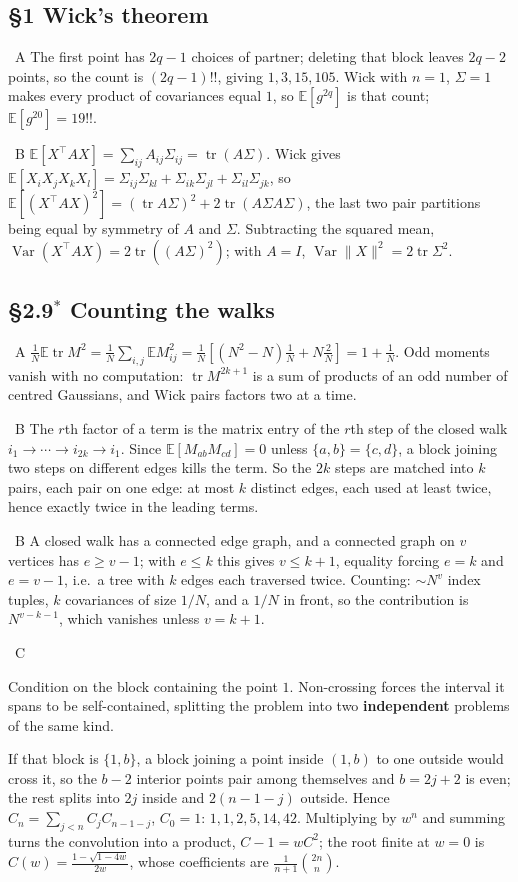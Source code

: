 \documentclass[10pt]{article}
\newcommand{\Q}[2]{\medskip\noindent{\color{acc}\textbf{#1}}\ {\scriptsize\color{grey}\textsc{#2}}\quad}
\newcommand{\E}{\mathbb{E}}
\newcommand{\Var}{\operatorname{Var}}
\newcommand{\Tr}{\operatorname{tr}}
\newcommand{\T}{^{\!\top}}
\begin{document}
\subsection{\S1 Wick's theorem}

\Q{1.6}{A} The first point has $2q-1$ choices of partner; deleting that block leaves $2q-2$ points, so the count is $(2q-1)!!$, giving $1,3,15,105$. Wick with $n=1$, $\Sigma=1$ makes every product of covariances equal $1$, so $\E[g^{2q}]$ is that count; $\E[g^{20}]=19!!$.

\Q{1.7}{B} $\E[X\T AX]=\sum_{ij}A_{ij}\Sigma_{ij}=\Tr(A\Sigma)$. Wick gives $\E[X_iX_jX_kX_l]=\Sigma_{ij}\Sigma_{kl}+\Sigma_{ik}\Sigma_{jl}+\Sigma_{il}\Sigma_{jk}$, so $\E[(X\T AX)^2]=(\Tr A\Sigma)^2+2\Tr(A\Sigma A\Sigma)$, the last two pair partitions being equal by symmetry of $A$ and $\Sigma$. Subtracting the squared mean, $\Var(X\T AX)=2\Tr((A\Sigma)^2)$; with $A=I$, $\Var\|X\|^2=2\Tr\Sigma^2$.

\subsection{\S2.9$^\ast$ Counting the walks}

\Q{2.12}{A} $\frac1N\E\Tr M^2=\frac1N\sum_{i,j}\E M_{ij}^2=\frac1N[(N^2-N)\tfrac1N+N\tfrac2N]=1+\frac1N$. Odd moments vanish with no computation: $\Tr M^{2k+1}$ is a sum of products of an odd number of centred Gaussians, and Wick pairs factors two at a time.

\Q{2.13}{B} The $r$th factor of a term is the matrix entry of the $r$th step of the closed walk $i_1\to\cdots\to i_{2k}\to i_1$. Since $\E[M_{ab}M_{cd}]=0$ unless $\{a,b\}=\{c,d\}$, a block joining two steps on different edges kills the term. So the $2k$ steps are matched into $k$ pairs, each pair on one edge: at most $k$ distinct edges, each used at least twice, hence exactly twice in the leading terms.

\Q{2.14}{B} A closed walk has a connected edge graph, and a connected graph on $v$ vertices has $e\ge v-1$; with $e\le k$ this gives $v\le k+1$, equality forcing $e=k$ and $e=v-1$, i.e.\ a tree with $k$ edges each traversed twice. Counting: $\sim N^v$ index tuples, $k$ covariances of size $1/N$, and a $1/N$ in front, so the contribution is $N^{v-k-1}$, which vanishes unless $v=k+1$.

\Q{2.15}{C}
\begin{idea}
Condition on the block containing the point $1$. Non-crossing forces the interval it spans to be self-contained, splitting the problem into two \textbf{independent} problems of the same kind.
\end{idea}
If that block is $\{1,b\}$, a block joining a point inside $(1,b)$ to one outside would cross it, so the $b-2$ interior points pair among themselves and $b=2j+2$ is even; the rest splits into $2j$ inside and $2(n-1-j)$ outside. Hence $C_n=\sum_{j<n}C_jC_{n-1-j}$, $C_0=1$: $1,1,2,5,14,42$. Multiplying by $w^n$ and summing turns the convolution into a product, $C-1=wC^2$; the root finite at $w=0$ is $C(w)=\frac{1-\sqrt{1-4w}}{2w}$, whose coefficients are $\frac{1}{n+1}\binom{2n}{n}$.
\end{document}
